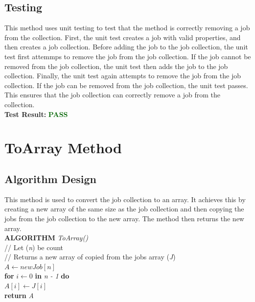\documentclass[12pt,a4paper]{article}
\begin{document}
		\subsection{Testing}
			This method uses unit testing to test that the method is correctly removing a job from the 
			collection. First, the unit test creates a job with valid properties, and then creates 
			a job collection. Before adding the job to the job collection, the unit test 
			first attemmps to remove the job from the job collection. If the job cannot 
			be removed from the job collection, the unit test then adds the job to the 
			job collection. Finally, the unit test again attempts to remove the job from the 
			job collection. If the job can be removed from the job collection, the unit test 
			passes. This ensures that the job collection can correctly remove a job from the collection.\\

			\textbf{Test Result:} \textbf{\textcolor{darkgreen}{PASS}}\\

	\newpage
			
	\section{ToArray Method}
		\subsection{Algorithm Design}
			This method is used to convert the job collection to an array. It achieves this by creating a 
			new array of the same size as the job collection and then copying the jobs from the job 
			collection to the new array. The method then returns the new array.\\

			\textbf{ALGORITHM} \textit{ToArray()}\\
			\null\hspace{1cm}// Let (\textit{n}) be count\\
			\null\hspace{1cm}// Returns a new array of copied from the jobs array (\textit{J})\\
			\null\hspace{1cm}\textit{$A \gets new Job[n]$}\\
			\null\hspace{1cm}\textbf{for} \textit{$i \gets 0$} \textbf{in} \textit{n - 1} \textbf{do}\\
			\null\hspace{2cm}\textit{$A[i] \gets J[i]$}\\
			\null\hspace{1cm}\textbf{return} \textit{A}\\
		
\end{document}
